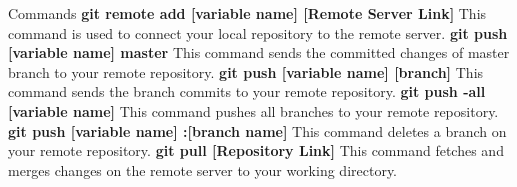 \documentclass[xcolor=x11names,compress]{beamer}
\renewcommand{\(}{\begin{columns}}
\renewcommand{\)}{\end{columns}}
\newcommand{\<}[1]{\begin{column}{#1}}
\renewcommand{\>}{\end{column}}
\begin{document}
		\begin{frame}{Commands}
		\textbf{git remote add [variable name] [Remote Server Link]		}	\newline	This command is used to connect your local repository to the remote server.	\newline	\newline
		\textbf{git push [variable name] master		}	\newline	This command sends the committed changes of master branch to your remote repository.	\newline	\newline	
		\textbf{ git push [variable name] [branch]		}	\newline	This command sends the branch commits to your remote repository.	\newline	\newline
		\textbf{git push -all [variable name]}	\newline	This command pushes all branches to your remote repository.	\newline	\newline
		\textbf{git push [variable name] :[branch name]		}	\newline	This command deletes a branch on your remote repository.
			\newline	\newline
		\textbf{git pull [Repository Link]		}	\newline	This command fetches and merges changes on the remote server to your working directory.	\newline	\newline
	\end{frame}
\end{document}
